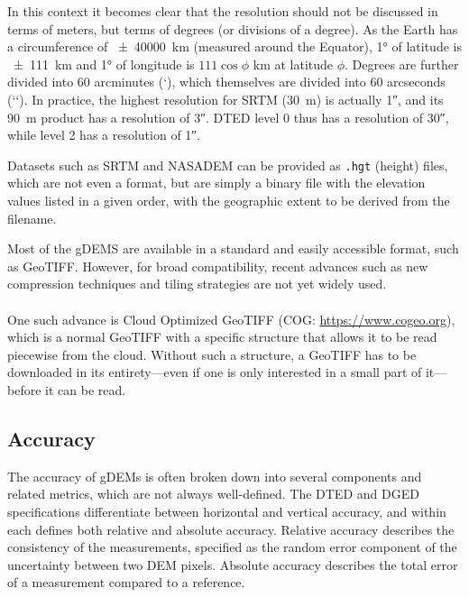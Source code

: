 In this context it becomes clear that the resolution should not be discussed in terms of meters, but terms of degrees (or divisions of a degree).
As the Earth has a circumference of \qty{\pm40000}{km} (measured around the Equator), \ang{1} of latitude is \qty{\pm111}{km} and \ang{1} of longitude is $111\cos\phi$ \unit{km} at latitude $\phi$.
Degrees are further divided into 60 arcminutes (\lq), which themselves are divided into 60 arcseconds (\lq\lq).
In practice, the highest resolution for SRTM (\qty{30}{m}) is actually \ang{;;1}, and its \qty{90}{m} product has a resolution of \ang{;;3}.
DTED level 0 thus has a resolution of \ang{;;30}, while level 2 has a resolution of \ang{;;1}.
%

Datasets such as SRTM and NASADEM can be provided as \texttt{.hgt} (height) files, which are not even a format, but are simply a binary file with the elevation values listed in a given order, with the geographic extent to be derived from the filename.


\begin{floatbox}
\begin{kaobox-practice}[frametitle=\faCog\ Downloading gDEMs]
Most of the gDEMS are available in a standard and easily accessible format, such as GeoTIFF\@.
However, for broad compatibility, recent advances such as new compression techniques and tiling strategies are not yet widely used.
\\ \\
One such advance is Cloud Optimized GeoTIFF (COG: \url{https://www.cogeo.org}), which is a normal GeoTIFF with a specific structure that allows it to be read piecewise from the cloud.
Without such a structure, a GeoTIFF has to be downloaded in its entirety---even if one is only interested in a small part of it---before it can be read.
\end{kaobox-practice}
\end{floatbox}

\subsection{Accuracy}

The accuracy of gDEMs is often broken down into several components and related metrics, which are not always well-defined.
The DTED and DGED specifications differentiate between horizontal and vertical accuracy, and within each defines both relative and absolute accuracy.
Relative accuracy describes the consistency of the measurements, specified as the random error component of the uncertainty between two DEM pixels. %
Absolute accuracy describes the total error of a measurement compared to a reference.


